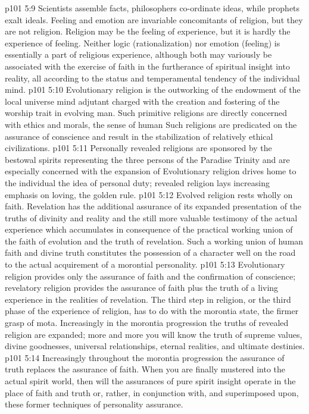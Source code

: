 \vs p101 5:9 \pc Scientists assemble facts, philosophers co\hyp{}ordinate ideas, while prophets exalt ideals. Feeling and emotion are invariable concomitants of religion, but they are not religion. Religion may be the feeling of experience, but it is hardly the experience of feeling. Neither logic (rationalization) nor emotion (feeling) is essentially a part of religious experience, although both may variously be associated with the exercise of faith in the furtherance of spiritual insight into reality, all according to the status and temperamental tendency of the individual mind.
\vs p101 5:10 Evolutionary religion is the outworking of the endowment of the local universe mind adjutant charged with the creation and fostering of the worship trait in evolving man. Such primitive religions are directly concerned with ethics and morals, the sense of human  Such religions are predicated on the assurance of conscience and result in the stabilization of relatively ethical civilizations.
\vs p101 5:11 Personally revealed religions are sponsored by the bestowal spirits representing the three persons of the Paradise Trinity and are especially concerned with the expansion of  Evolutionary religion drives home to the individual the idea of personal duty; revealed religion lays increasing emphasis on loving, the golden rule.
\vs p101 5:12 Evolved religion rests wholly on faith. Revelation has the additional assurance of its expanded presentation of the truths of divinity and reality and the still more valuable testimony of the actual experience which accumulates in consequence of the practical working union of the faith of evolution and the truth of revelation. Such a working union of human faith and divine truth constitutes the possession of a character well on the road to the actual acquirement of a morontial personality.
\vs p101 5:13 \pc Evolutionary religion provides only the assurance of faith and the confirmation of conscience; revelatory religion provides the assurance of faith plus the truth of a living experience in the realities of revelation. The third step in religion, or the third phase of the experience of religion, has to do with the morontia state, the firmer grasp of mota. Increasingly in the morontia progression the truths of revealed religion are expanded; more and more you will know the truth of supreme values, divine goodnesses, universal relationships, eternal realities, and ultimate destinies.
\vs p101 5:14 Increasingly throughout the morontia progression the assurance of truth replaces the assurance of faith. When you are finally mustered into the actual spirit world, then will the assurances of pure spirit insight operate in the place of faith and truth or, rather, in conjunction with, and superimposed upon, these former techniques of personality assurance.
